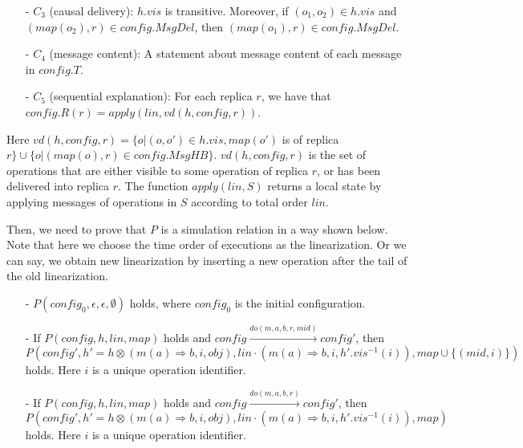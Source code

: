 {\begin{itemize}
\item[-] $C_3$ (causal delivery): $h.\mathit{vis}$ is transitive. Moreover, if $(o_1,o_2) \in h.\mathit{vis}$ and $(\mathit{map}(o_2),r) \in \mathit{config}.\mathit{MsgDel}$, then $(\mathit{map}(o_1),r) \in \mathit{config}.\mathit{MsgDel}$.

\item[-] $C_4$ (message content): A statement about message content of each message in $\mathit{config}.T$.

\item[-] $C_5$ (sequential explanation): For each replica $r$, we have that $\mathit{config}.R(r) = \mathit{apply}(\mathit{lin},\mathit{vd}(h,\mathit{config},r))$.
\end{itemize}

Here $\mathit{vd}(h,\mathit{config},r) = \{ o \vert (o,o') \in h.\mathit{vis}, \mathit{map}(o')$ is of replica $r \} \cup \{ o \vert (\mathit{map}(o),r) \in \mathit{config}.\mathit{MsgHB} \}$. $\mathit{vd}(h,\mathit{config},r)$ is the set of operations that are either visible to some operation of replica $r$, or has been delivered into replica $r$. The function $\mathit{apply}(\mathit{lin},S)$ returns a local state by applying messages of operations in $S$ according to total order $\mathit{lin}$.


Then, we need to prove that $P$ is a simulation relation in a way shown below. Note that here we choose the time order of executions as the linearization. Or we can say, we obtain new linearization by inserting a new operation after the tail of the old linearization.

\begin{itemize}
\setlength{\itemsep}{0.5pt}
\item[-] $P(\mathit{config}_0,\epsilon,\epsilon,\emptyset)$ holds, where $\mathit{config}_0$ is the initial configuration.

\item[-] If $P(\mathit{config},h,\mathit{lin},\mathit{map})$ holds and $\mathit{config} {\xrightarrow{\mathit{do}(m,a,b,r,\mathit{mid})}} \mathit{config}'$, then $P(\mathit{config}', h' = h \otimes (m(a) \Rightarrow b,i,\mathit{obj}), \mathit{lin} \cdot (m(a) \Rightarrow b,i,h'.\mathit{vis}^{-1}(i)),\mathit{map} \cup \{ (\mathit{mid}, i) \})$ holds. Here $i$ is a unique operation identifier.

\item[-] If $P(\mathit{config},h,\mathit{lin},\mathit{map})$ holds and $\mathit{config} {\xrightarrow{\mathit{do}(m,a,b,r)}} \mathit{config}'$, then $P(\mathit{config}',h' = h \otimes (m(a) \Rightarrow b,i,\mathit{obj}), \mathit{lin} \cdot (m(a) \Rightarrow b,i,h'.\mathit{vis}^{-1}(i)),\mathit{map})$ holds. Here $i$ is a unique operation identifier.


\end{itemize}}
